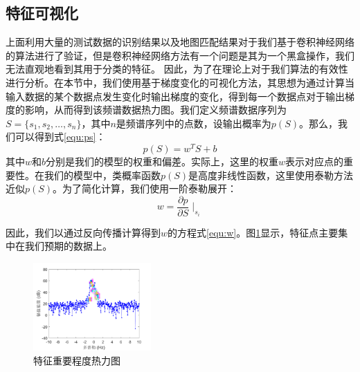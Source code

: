 \subsection{特征可视化}

上面利用大量的测试数据的识别结果以及地图匹配结果对于我们基于卷积神经网络的算法进行了验证，但是卷积神经网络方法有一个问题是其为一个黑盒操作，我们无法直观地看到其用于分类的特征。
因此，为了在理论上对于我们算法的有效性进行分析。在本节中，我们使用基于梯度变化的可视化方法，其思想为通过计算当输入数据的某个数据点发生变化时输出梯度的变化，得到每一个数据点对于输出梯度的影响，从而得到该频谱数据热力图。我们定义频谱数据序列为$ S = \{s_1, s_2, \dots,s_n\} $，其中$n$是频谱序列中的点数，设输出概率为$p(S)$。那么，我们可以得到式\ref{equ:ps}：
\begin{equation}
	p(S) = w^TS+b
	\label{equ:ps}
\end{equation}
其中$ w $和$ b $分别是我们的模型的权重和偏差。实际上，这里的权重$ w $表示对应点的重要性。在我们的模型中，类概率函数$p(S)$是高度非线性函数，这里使用泰勒方法近似$p(S)$。为了简化计算，我们使用一阶泰勒展开：
\begin{equation}
	w = \frac{\partial{p}}{\partial{S}}{\mid}_{s_i}
	\label{equ:w}
\end{equation}

因此，我们以通过反向传播计算得到$ w $的方程式\ref{equ:w}。图\ref{fig:vis}显示，特征点主要集中在我们预期的数据上。
\begin{figure}[H]
	\centering
	\includegraphics[width=0.4\textwidth]{figures/othr/heatmap}
	\caption{特征重要程度热力图}
	\label{fig:vis}
\end{figure}


